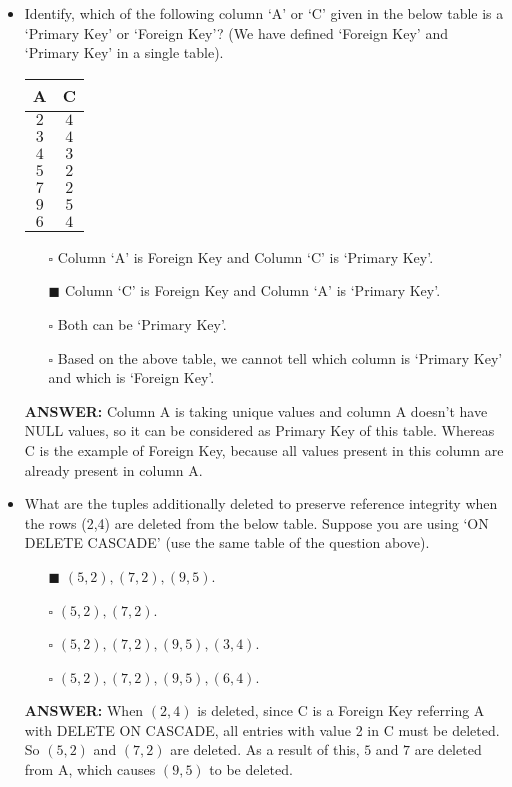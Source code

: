 \documentclass[10pt]{article}
\newcommand{\lightrule}{%
	\arrayrulecolor{black!30}%
	\midrule[\lightrulewidth]%
	\arrayrulecolor{black}}
\begin{document}
\begin{itemize}
		\item Identify, which of the following column ‘A’ or ‘C’ given in the below table is a ‘Primary Key’ or ‘Foreign Key’? (We have defined ‘Foreign Key’ and ‘Primary Key’ in a single table).
			\begin{center}
				\centering
				\begin{tabular}{@{} *{2}{c} @{}}
					\toprule
						\textbf{A} & \textbf{C} \\
					\midrule
						$2$ & $4$  \\ 
					\lightrule
						$3$ & $4$  \\  
					\lightrule
						$4$ & $3$  \\
					\lightrule 
						$5$ & $2$  \\ 
					\lightrule 
						$7$ & $2$  \\ 
					\lightrule 
						$9$ & $5$  \\ 
					\lightrule 
						$6$ & $4$  \\
					\bottomrule
				\end{tabular}
			\end{center}

			\begin{enumerate}
				\item[$\square$] Column ‘A’ is Foreign Key and Column ‘C’ is ‘Primary Key’.
				\item[$\blacksquare$] Column ‘C’ is Foreign Key and Column ‘A’ is ‘Primary Key’.
				\item[$\square$] Both can be ‘Primary Key’.
				\item[$\square$] Based on the above table, we cannot tell which column is ‘Primary Key’ and which is ‘Foreign Key’.
			\end{enumerate}
			\color{red} \textbf{ANSWER:} \color{black} Column A is taking unique values and column A doesn’t have NULL values, so it can be considered as Primary Key of this table. Whereas C is the example of Foreign Key, because all values present in this column are already present in column A.

		\item What are the tuples additionally deleted to preserve reference integrity when the rows (2,4) are deleted from the below table. Suppose you are using ‘ON DELETE CASCADE’ (use the same table of the question above).
			\begin{enumerate}
				\item[$\blacksquare$] $(5,2), (7,2), (9,5)$.
				\item[$\square$] $(5,2), (7,2)$.
				\item[$\square$] $(5,2), (7,2), (9,5), (3,4)$.
				\item[$\square$] $(5,2), (7,2),(9,5), (6,4)$.
			\end{enumerate}
			\color{red} \textbf{ANSWER:} \color{black} When $(2,4)$ is deleted, since C is a Foreign Key referring A with DELETE ON CASCADE, all entries with value 2 in C must be deleted. So $(5,2)$ and $(7,2)$ are deleted. As a result of this, $5$ and $7$ are deleted from A, which causes $(9, 5)$ to be deleted.
		

\end{itemize}
\end{document}
